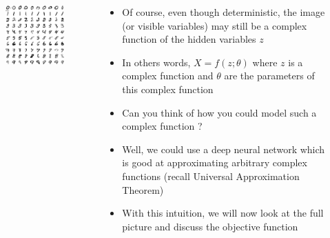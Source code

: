 \begin{frame}
	\begin{columns}
		\begin{overlayarea}{\textwidth}{\textheight}
			\vspace{3pt}
			\begin{figure}
				\centering
				\includegraphics[scale=0.3]{images/mnist.png}
			\end{figure}
		\end{overlayarea}
		\begin{overlayarea}{\textwidth}{\textheight}
			\begin{itemize}\justifying
				\item<1-> Of course, even though deterministic, the image (or visible variables) may still be a complex function of the hidden variables $z$
				\item<2-> In others words, $X = f (z; \theta)$ where $z$ is a complex function and $\theta$ are the parameters of this complex function
				\item<3-> Can you think of how you could model such a complex function ? 
				\item<4-> Well, we could use a deep neural network which is good at approximating arbitrary complex functions (recall Universal Approximation Theorem)
				\item<5-> With this intuition, we will now look at the full picture and discuss the objective function
			\end{itemize}
		\end{overlayarea}
	\end{columns}
\end{frame}



